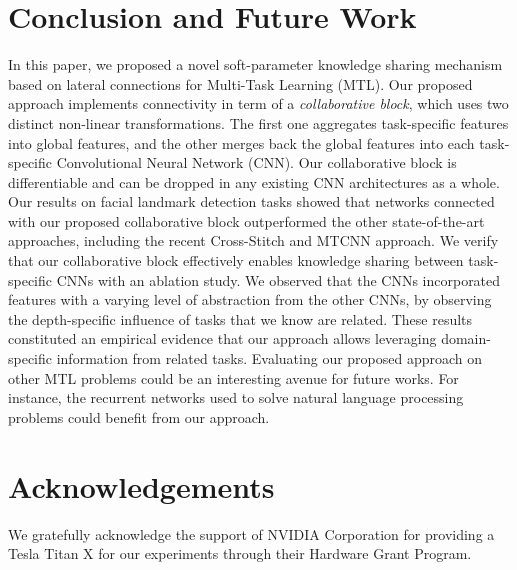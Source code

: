 \documentclass[runningheads]{llncs}
\begin{document}
\section{Conclusion and Future Work}
\label{sec:conclusion}
In this paper, we proposed a novel soft-parameter knowledge sharing mechanism based on lateral connections for Multi-Task Learning (MTL). Our proposed approach implements connectivity in term of a \textit{collaborative block}, which uses two distinct non-linear transformations. The first one aggregates task-specific features into global features, and the other merges back the global features into each task-specific Convolutional Neural Network (CNN). Our collaborative block is differentiable and can be dropped in any existing CNN architectures as a whole.
Our results on facial landmark detection tasks showed that networks connected with our proposed collaborative block outperformed the other state-of-the-art approaches, including the recent Cross-Stitch and MTCNN approach. We verify that our collaborative block effectively enables knowledge sharing between task-specific CNNs with an ablation study. We observed that the CNNs incorporated features with a varying level of abstraction from the other CNNs, by observing the depth-specific influence of tasks that we know are related. These results constituted an empirical evidence that our approach allows leveraging domain-specific information from related tasks. 
Evaluating our proposed approach on other MTL problems could be an interesting avenue for future works. For instance, the recurrent networks used to solve natural language processing problems could benefit from our approach.


\section*{Acknowledgements}

We gratefully acknowledge the support of NVIDIA Corporation for providing a Tesla Titan X for our experiments through their Hardware Grant Program.



\end{document}
